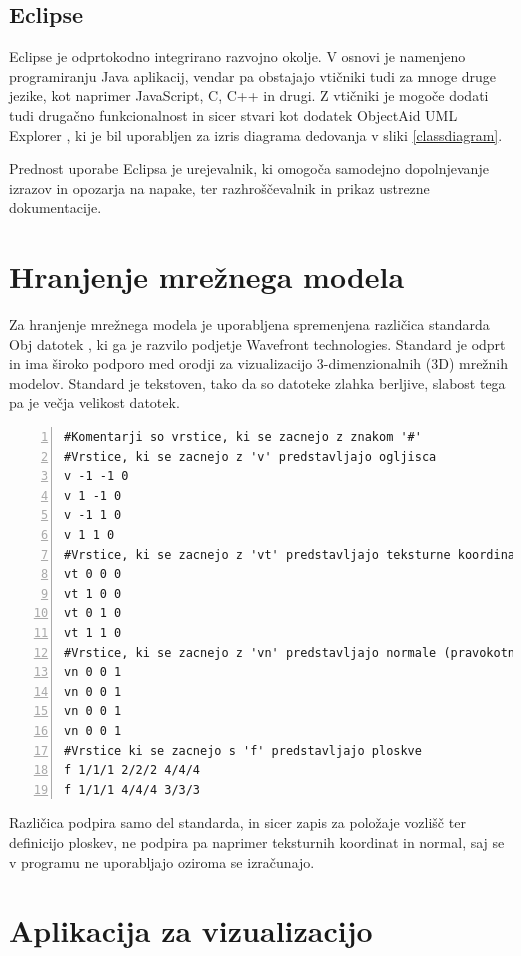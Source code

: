 \documentclass[a4paper, 12pt]{book}
\begin{document}
\subsection*{Eclipse}

Eclipse je odprtokodno integrirano razvojno okolje. V osnovi je namenjeno programiranju Java aplikacij, vendar pa obstajajo vtičniki tudi za mnoge druge jezike, kot naprimer JavaScript, C, C++ in drugi. Z vtičniki je mogoče dodati tudi drugačno funkcionalnost in sicer stvari kot dodatek ObjectAid UML Explorer \cite{objectaid}, ki je bil uporabljen za izris diagrama dedovanja v sliki \ref{classdiagram}.

Prednost uporabe Eclipsa je urejevalnik, ki omogoča samodejno dopolnjevanje izrazov in opozarja na napake, ter razhroščevalnik in prikaz ustrezne dokumentacije. 

\section{Hranjenje mrežnega modela}

Za hranjenje mrežnega modela je uporabljena spremenjena različica standarda Obj datotek \cite{obj}, ki ga je razvilo podjetje Wavefront technologies. Standard je odprt in ima široko podporo med orodji za vizualizacijo 3-dimenzionalnih (3D) mrežnih modelov. Standard je tekstoven, tako da so datoteke zlahka berljive, slabost tega pa je večja velikost datotek.
\renewcommand{\lstlistingname}{Datoteka}
\renewcommand{\lstlistlistingname}{Seznam datotek}
\footnotesize{
\begin{lstlisting}[captionpos=b, frame=single, caption={Primer Obj datoteke, ki predstavlja kvadrat.}, breaklines=true, firstline=1, numbers=left]
#Komentarji so vrstice, ki se zacnejo z znakom '#'
#Vrstice, ki se zacnejo z 'v' predstavljajo ogljisca 
v -1 -1 0
v 1 -1 0
v -1 1 0
v 1 1 0
#Vrstice, ki se zacnejo z 'vt' predstavljajo teksturne koordinate
vt 0 0 0
vt 1 0 0
vt 0 1 0
vt 1 1 0
#Vrstice, ki se zacnejo z 'vn' predstavljajo normale (pravokotnice?)
vn 0 0 1
vn 0 0 1
vn 0 0 1
vn 0 0 1
#Vrstice ki se zacnejo s 'f' predstavljajo ploskve
f 1/1/1 2/2/2 4/4/4
f 1/1/1 4/4/4 3/3/3
\end{lstlisting}}

Različica podpira samo del standarda, in sicer zapis za položaje vozlišč ter definicijo ploskev, ne podpira pa naprimer teksturnih koordinat in normal, saj se v programu ne uporabljajo oziroma se izračunajo.

\section{Aplikacija za vizualizacijo}
\end{document}

